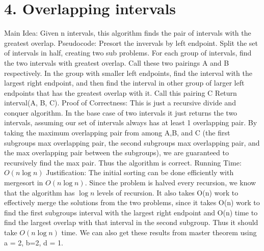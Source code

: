 \documentclass[11pt]{article}
\begin{document}
\section*{4. Overlapping intervals}
Main Idea: \newline
Given n intervals, this algorithm finds the pair of intervals with the greatest overlap.\newline
Pseudocode:\newline
Presort the invervals by left endpoint.\newline
Split the set of intervals in half, creating two sub problems.\newline
For each group of intervals, find the two intervals with greatest overlap. Call these two pairings A and B respectively.\newline
In the group with smaller left endpoints, find the interval with the largest right endpoint, and then find the interval in other group of larger left endpoints that has the greatest overlap with it. Call this pairing C
Return interval(A, B, C).\newline
Proof of Correctness:\newline
This is just a recursive divide and conquer algorithm. In the base case of two intervals it just returns the two intervals, assuming our set of intervals always has at least 1 overlapping pair. By taking the maximum overlapping pair from among A,B, and C (the first subgroups max overlapping pair, the second subgroups max overlapping pair, and the max overlapping pair between the subgroups), we are guaranteed to recursively find the max pair. Thus the algorithm is correct.\newline
Running Time:\newline
$O(n\log n)$\newline
Justification:\newline
The initial sorting can be done efficiently with mergesort in $O(n \log n)$. Since the problem is halved every recursion, we know that the algorithm has $\log n$ levels of recursion. It also takes O(n) work to effectively merge the solutions from the two problems, since it takes O(n) work to find the first subgroups interval with the largest right endpoint and O(n) time to find the largest overlap with that interval in the second subgroup. Thus it should take $O(n\log n)$ time. We can also get these results from master theorem using a = 2, b=2, d = 1.


\newpage
\end{document}

